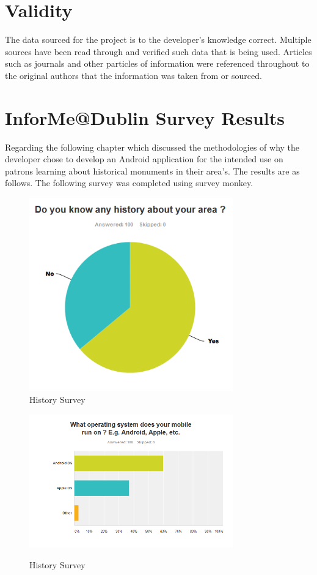 \section{Validity}
The data sourced for the project is to the developer's knowledge correct. Multiple sources have been read through and verified such data that is being used. Articles such as journals and other particles of information were referenced throughout to the original authors that the information was taken from or sourced.
\section{InforMe@Dublin Survey Results}
Regarding the following chapter which discussed the methodologies of why the developer chose to develop an Android application for the intended use on patrons learning about historical monuments in their area's. The results are as follows. The following survey was completed using survey monkey.

\begin{figure}[!tbp]
    \centering
    \begin{minipage}[b]{0.4\textwidth}
        \includegraphics[width=250pt]{Survey1}\\
        \caption{History Survey} 
        \label{Figure: History Survey}
    \end{minipage}
    \hfill
    \begin{minipage}[b]{0.4\textwidth}
        \includegraphics[width=250pt]{Survey2}\\
        \caption{History Survey} 
        \label{Figure: History Survey}
    \end{minipage}
\end{figure}

